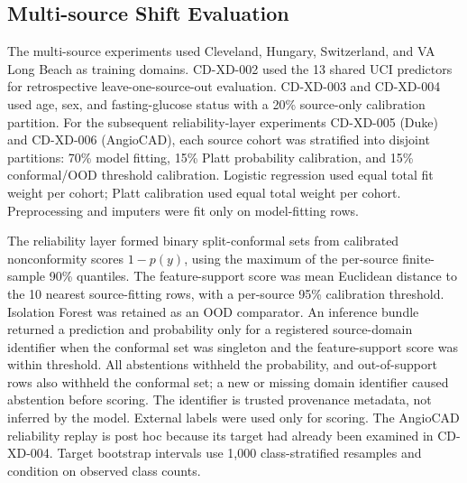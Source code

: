 \documentclass[journal]{IEEEtran}
\begin{document}
\subsection{Multi-source Shift Evaluation}
The multi-source experiments used Cleveland, Hungary, Switzerland, and VA Long
Beach as training domains. CD-XD-002 used the 13 shared UCI predictors for
retrospective leave-one-source-out evaluation. CD-XD-003 and CD-XD-004 used
age, sex, and fasting-glucose status with a 20\% source-only calibration
partition. For the subsequent reliability-layer experiments CD-XD-005
(Duke) and CD-XD-006 (AngioCAD), each source cohort was stratified into
disjoint partitions: 70\% model fitting, 15\% Platt probability calibration,
and 15\% conformal/OOD threshold calibration. Logistic regression used equal
total fit weight per cohort; Platt calibration used equal total weight per
cohort. Preprocessing and imputers were fit only on model-fitting rows.

The reliability layer formed binary split-conformal sets from calibrated
nonconformity scores \(1-p(y)\), using the maximum of the per-source
finite-sample 90\% quantiles. The feature-support score was mean Euclidean
distance to the 10 nearest source-fitting rows, with a per-source 95\%
calibration threshold. Isolation Forest was retained as an OOD comparator. An
inference bundle returned a prediction and probability only for a registered
source-domain identifier when the conformal set was singleton and the
feature-support score was within threshold. All abstentions withheld the
probability, and out-of-support rows also withheld the conformal set; a new or
missing domain identifier caused abstention before scoring. The identifier is
trusted provenance metadata, not inferred by the model. External labels were
used only for scoring. The AngioCAD reliability replay is post hoc because its target had
already been examined in CD-XD-004. Target bootstrap intervals use 1,000
class-stratified resamples and condition on observed class counts.
\end{document}
